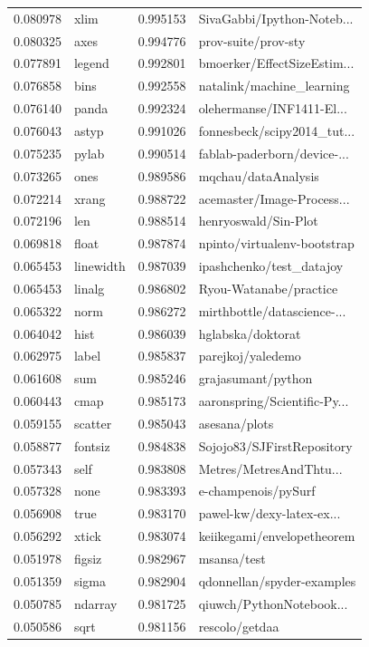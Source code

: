 \documentclass[conference,10pt]{IEEEtran}
\begin{document}
\begin{figure}[H]
\begin{tabularx}{0.5\textwidth}{| l | l || l | X |}
0.080978 & xlim & 0.995153 & SivaGabbi/Ipython-Noteb... \\
0.080325 & axes & 0.994776 & prov-suite/prov-sty \\
0.077891 & legend & 0.992801 & bmoerker/EffectSizeEstim... \\
0.076858 & bins & 0.992558 & natalink/machine\_learning \\
0.076140 & panda & 0.992324 & olehermanse/INF1411-El... \\
0.076043 & astyp & 0.991026 & fonnesbeck/scipy2014\_tut... \\
0.075235 & pylab & 0.990514 & fablab-paderborn/device-... \\
0.073265 & ones & 0.989586 & mqchau/dataAnalysis \\
0.072214 & xrang & 0.988722 & acemaster/Image-Process... \\
0.072196 & len & 0.988514 & henryoswald/Sin-Plot \\
0.069818 & float & 0.987874 & npinto/virtualenv-bootstrap \\
0.065453 & linewidth & 0.987039 & ipashchenko/test\_datajoy \\
0.065453 & linalg & 0.986802 & Ryou-Watanabe/practice \\
0.065322 & norm & 0.986272 & mirthbottle/datascience-... \\
0.064042 & hist & 0.986039 & hglabska/doktorat \\
0.062975 & label & 0.985837 & parejkoj/yaledemo \\
0.061608 & sum & 0.985246 & grajasumant/python \\
0.060443 & cmap & 0.985173 & aaronspring/Scientific-Py... \\
0.059155 & scatter & 0.985043 & asesana/plots \\
0.058877 & fontsiz & 0.984838 & Sojojo83/SJFirstRepository \\
0.057343 & self & 0.983808 & Metres/MetresAndThtu... \\
0.057328 & none & 0.983393 & e-champenois/pySurf \\
0.056908 & true & 0.983170 & pawel-kw/dexy-latex-ex... \\
0.056292 & xtick & 0.983074 & keiikegami/envelopetheorem \\
0.051978 & figsiz & 0.982967 & msansa/test \\
0.051359 & sigma & 0.982904 & qdonnellan/\mbox{spyder-examples} \\
0.050785 & ndarray & 0.981725 & qiuwch/PythonNotebook... \\
0.050586 & sqrt & 0.981156 & rescolo/getdaa \\
\hline
\end{tabularx}
\end{figure}

\clearpage
\pagebreak


\end{document}
